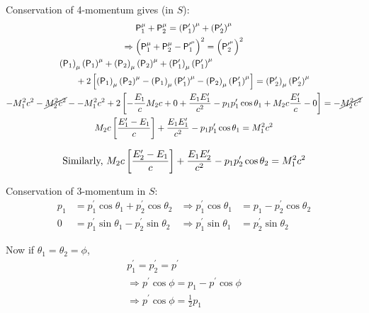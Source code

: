 \begin{parts}
	Conservation of 4-momentum gives (in $S$):
	\begin{gather}
		\mathsf{P}_1^\mu + \mathsf{P}_2^\mu = \left(\mathsf{P}_1^\prime\right)^\mu + \left(\mathsf{P}_2^\prime\right)^\mu \notag \\
		\Rightarrow \left(\mathsf{P}_1^\mu + \mathsf{P}_2^\mu - \mathsf{P}_1^{\prime^\mu}\right)^2 = \left(\mathsf{P}_2^{\prime^\mu}\right)^2 \notag \\
		\begin{aligned}
			&\left(\mathsf{P}_1\right)_\mu \left(\mathsf{P}_1\right)^\mu
			+ \left(\mathsf{P}_2\right)_\mu \left(\mathsf{P}_2\right)^\mu
			+ \left(\mathsf{P}_1^\prime\right)_\mu \left(\mathsf{P}_1^\prime\right)^\mu \\
			&\qquad + 2\left[
				\left(\mathsf{P}_1\right)_\mu \left(\mathsf{P}_2\right)^\mu
				- \left(\mathsf{P}_1\right)_\mu \left(\mathsf{P}_1^\prime\right)^\mu
				- \left(\mathsf{P}_2\right)_\mu \left(\mathsf{P}_1^\prime\right)^\mu
			\right] = \left(\mathsf{P}_2^\prime\right)_\mu \left(\mathsf{P}_2^\prime\right)^\mu
		\end{aligned} \notag \\
		-M_1^2 c^2 - \cancel{M_2^2 c^2} - -M_1^2 c^2
		+ 2\left[
			-\frac{E_1}{c} M_2 c
			+ 0
			+ \frac{E_1 E_1^\prime}{c^2}
			- p_1 p_1^\prime \cos\theta_1
			+ M_2 c \frac{E_1^\prime}{c}
			- 0
		\right] = -\cancel{M_2^2 c^2} \notag \\
		M_2 c \left[\frac{E_1^\prime - E_1}{c}\right] + \frac{E_1 E_1^\prime}{c^2} - p_1 p_1^\prime \cos\theta_1 = M_1^2 c^2
		\label{eqn:q3-e1prime}
	\end{gather}
	
	\begin{equation}
		\textnormal{Similarly, }
		M_2 c \left[\frac{E_2^\prime - E_1}{c}\right] + \frac{E_1 E_2^\prime}{c^2} - p_1 p_2^\prime \cos\theta_2 = M_1^2 c^2
		\label{eqn:q3-e2prime}
	\end{equation}
	
	Conservation of 3-momentum in $S$:
	\begin{align*}
		p_1 &= p_1^\prime \cos\theta_1 + p_2^\prime \cos\theta_2
		&\Rightarrow p_1^\prime \cos\theta_1 &= p_1 - p_2^\prime \cos\theta_2 \\
		0 &= p_1^\prime \sin\theta_1 - p_2^\prime \sin\theta_2
		&\Rightarrow p_1^\prime \sin\theta_1 &= p_2^\prime \sin\theta_2
	\end{align*}
	
	Now if $\theta_1 = \theta_2 = \phi$,
	\begin{gather*}
		p_1^\prime = p_2^\prime = p^\prime \\
		\Rightarrow p^\prime \cos\phi = p_1 - p^\prime \cos\phi \\
		\Rightarrow p^\prime \cos\phi = \frac{1}{2} p_1
	\end{gather*}
	

\end{parts}
